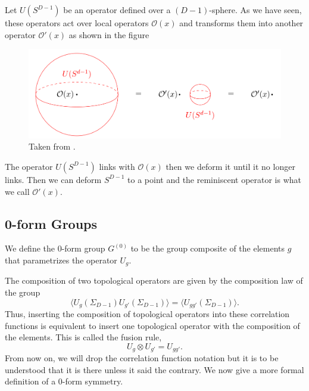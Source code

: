\documentclass{article}
\begin{document}
Let   $U(S^{D-1})$ be an operator defined over a $(D-1)$-sphere.  As we have seen, these operators act over local operators $\mathcal{O}(x)$ and transforms them into another operator $\mathcal{O}'(x)$  as shown in the figure
\begin{figure}[H]
\centering
\includegraphics[scale=0.3]{figures/linking.png}
\caption{Taken from \cite{Bhardwaj}.}
\end{figure}
The operator $U(S^{D-1})$ links with $\mathcal{O}(x)$ then we deform it until it no longer links. Then we can deform $S^{D-1}$ to a point and the reminiscent operator is what we call $\mathcal{O}'(x).$ 
\subsection{0-form Groups}
We define the 0-form group $G^{(0)}$ to be the group composite of the elements $g$ that parametrizes the operator $U_g.$

The composition of two topological operators are given by the composition law of the group
\begin{equation}
	\langle U_g(\Sigma_{D-1})U_{g'}(\Sigma_{D-1})\rangle=\langle U_{gg'}(\Sigma_{D-1})\rangle.
\end{equation}
Thus, inserting the composition of topological operators into these correlation functions is equivalent to insert one topological operator with the composition of the elements. This is called the fusion rule,
\begin{equation}
	U_g\otimes U_{g'}=U_{gg'}.
\end{equation}
From now on, we will drop the correlation function notation but it is to be understood that it is there unless it said the contrary.  We now give a more formal definition of a 0-form symmetry. 
\end{document}
